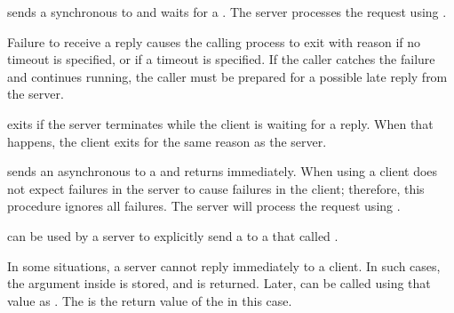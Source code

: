  sends a synchronous  to
 and waits for a . The server processes the
request using .

Failure to receive a reply causes the calling process to exit with
reason  if no timeout is specified, or  if
a timeout is specified. If the caller catches the failure and
continues running, the caller must be prepared for a possible late
reply from the server.

 exits if the server terminates while the
client is waiting for a reply. When that happens, the client exits for
the same reason as the server.

\begin{procedure}
\end{procedure}
\returns{}

\begin{argtbl}
\end{argtbl}

 sends an asynchronous  to a
 and returns  immediately. When using
 a client does not expect failures in the
server to cause failures in the client; therefore, this procedure
ignores all failures. The server will process the request using
.

\begin{procedure}
\end{procedure}
\returns{}

\begin{argtbl}
\end{argtbl}

 can be used by a server to explicitly send a
 to a  that called .

In some situations, a server cannot reply immediately to a client. In
such cases, the  argument inside  is
stored, and  is returned.  Later,
 can be called using that  value as
. The  is the return value of the
 in this case.

